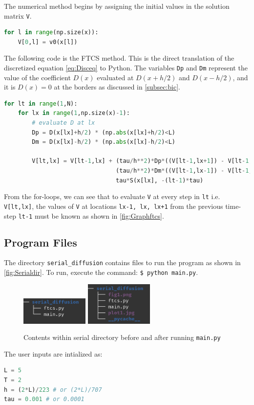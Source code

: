 The numerical method begins by assigning the initial values in the solution matrix \texttt{V}.
\begin{lstlisting}[language=Python]
for l in range(np.size(x)):
    V[0,l] = v0(x[l])
\end{lstlisting}

The following code is the FTCS method. This is the direct translation of the discretized equation \autoref{eq:Disceq} to Python. The variables \texttt{Dp} and \texttt{Dm} represent the value of the coefficient $D(x)$ evaluated at $D(x+h/2)$ and $D(x-h/2)$, and it is $D(x) = 0$ at the borders as discussed in \autoref{subsec:bic}.

\begin{lstlisting}[language=Python]
for lt in range(1,N):
    for lx in range(1,np.size(x)-1):
        # evaluate D at lx
        Dp = D(x[lx]+h/2) * (np.abs(x[lx]+h/2)<L)
        Dm = D(x[lx]-h/2) * (np.abs(x[lx]-h/2)<L)

        V[lt,lx] = V[lt-1,lx] + (tau/h**2)*Dp*((V[lt-1,lx+1]) - V[lt-1,lx])+\
                                (tau/h**2)*Dm*((V[lt-1,lx-1]) - V[lt-1,lx])+\
                                tau*S(x[lx], -(lt-1)*tau)
\end{lstlisting}
From the for-loops, we can see that to evaluate \texttt{V} at every step in \texttt{lt} i.e. \texttt{V[lt,lx]}, the values of \texttt{V} at locations \texttt{lx-1, lx, lx+1} from the previous time-step \texttt{lt-1} must be known as shown in \autoref{fig:Graphftcs}.

\graphftcs

\subsection{Program Files}
The directory \texttt{serial\_diffusion} contains files to run the program as shown in \autoref{fig:Serialdir}. To run, execute the command: \texttt{\$ python main.py}.
\begin{figure}[H]
    \centering
    \includegraphics[width=0.3\textwidth]{figures/serial_dir0.png}
    \includegraphics[width=0.3\textwidth]{figures/serial_dir1.png}
    \caption{Contents within serial directory before and after running \texttt{main.py}}
    \label{fig:Serialdir}
\end{figure}
The user inputs are intialized as:
\begin{lstlisting}[language=Python]
L = 5
T = 2
h = (2*L)/223 # or (2*L)/707
tau = 0.001 # or 0.0001
\end{lstlisting}

